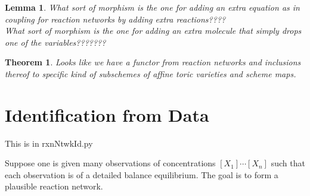 \documentclass[11pt]{book}
\theoremstyle{change}
\newtheorem{thm}[equation]{Theorem}
\newtheorem{lemma}[equation]{Lemma}
\theoremstyle{nonumberplain}
\numberwithin{equation}{section}
\begin{document}
\begin{lemma}
What sort of morphism is the one for adding an extra equation as in coupling for reaction networks by adding extra reactions????\\
What sort of morphism is the one for adding an extra molecule that simply drops one of the variables???????\\
\end{lemma}

\begin{thm}
Looks like we have a functor from reaction networks and inclusions thereof to specific kind of subschemes of affine toric varieties and scheme maps.
\end{thm}

\section{Identification from Data}

This is in rxnNtwkId.py

Suppose one is given many observations of concentrations $[X_1] \cdots [X_n]$ such that each observation is of a detailed balance equilibrium. The goal is to form a plausible reaction network.
\end{document}

